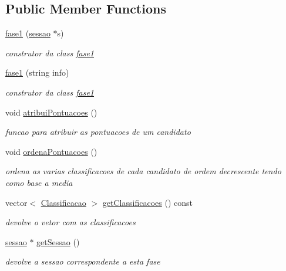 \subsection*{Public Member Functions}
\begin{DoxyCompactItemize}
\item 
\hyperlink{classfase1_aa2bdac71181493e27b744862925c944b}{fase1} (\hyperlink{classsessao}{sessao} $\ast$s)
\begin{DoxyCompactList}\small\item\em construtor da class \hyperlink{classfase1}{fase1} \end{DoxyCompactList}\item 
\hyperlink{classfase1_a45c3a7c99c90a1c7079cf6045416b33c}{fase1} (string info)
\begin{DoxyCompactList}\small\item\em construtor da class \hyperlink{classfase1}{fase1} \end{DoxyCompactList}\item 
void \hyperlink{classfase1_ad4bd20d6f65510c72c6924cbd77b5af0}{atribui\+Pontuacoes} ()
\begin{DoxyCompactList}\small\item\em funcao para atribuir as pontuacoes de um candidato \end{DoxyCompactList}\item 
void \hyperlink{classfase1_a630facb1c550249547876d73e2e9c2c9}{ordena\+Pontuacoes} ()
\begin{DoxyCompactList}\small\item\em ordena as varias classificacoes de cada candidato de ordem decrescente tendo como base a media \end{DoxyCompactList}\item 
vector$<$ \hyperlink{structClassificacao}{Classificacao} $>$ \hyperlink{classfase1_ab228229f675fb1581459b826f31d3d82}{get\+Classificacoes} () const 
\begin{DoxyCompactList}\small\item\em devolve o vetor com as classificacoes \end{DoxyCompactList}\item 
\hyperlink{classsessao}{sessao} $\ast$ \hyperlink{classfase1_aa6e3c8314c055f90cec3b0a033e5b54e}{get\+Sessao} ()
\begin{DoxyCompactList}\small\item\em devolve a sessao correspondente a esta fase \end{DoxyCompactList}\end{DoxyCompactItemize}

